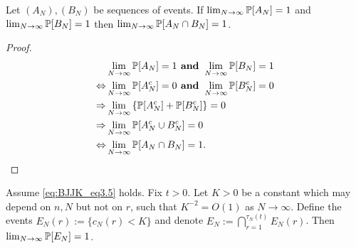 \begin{lemma}\label{thm:lim_AandB}
Let $(A_N) , (B_N)$ be sequences of events. 
If $\lim_{N\to\infty}\mathbb{P}[A_N] =1$ and $\lim_{N\to\infty}\mathbb{P}[B_N]=1$ then $\lim_{N\to\infty} \mathbb{P} [A_N \cap B_N] =1$.
\end{lemma}
\begin{proof}
\begin{align*}
&\lim_{N\to\infty} \mathbb{P}[A_N] =1 \textbf{ and } 
        \lim_{N\to\infty} \mathbb{P}[B_N] =1 \notag\\
\Leftrightarrow &\lim_{N\to\infty} \mathbb{P}[A_N^c] =0 \textbf{ and } 
        \lim_{N\to\infty} \mathbb{P}[B_N^c] =0 \notag\\
\Rightarrow &\lim_{N\to\infty} \left\{ \mathbb{P}[A_N^c] 
        + \mathbb{P}[B_N^c] \right\} =0 \notag\\
\Rightarrow &\lim_{N\to\infty} \mathbb{P}[A_N^c \cup B_N^c] =0 \notag\\
\Leftrightarrow &\lim_{N\to\infty} \mathbb{P}[ A_N \cap B_N ] =1. \qedhere
\end{align*}
\end{proof}

\begin{lemma}\label{thm:indicators_cN}
Assume \eqref{eq:BJJK_eq3.5} holds. Fix $t>0$.
Let $K>0$ be a constant which may depend on $n, N$ but not on $r$, such that $K^{-2} = O(1)$ as $N\to\infty$.
Define the events $E_N(r) := \{ c_N(r) < K \}$ and denote $E_N := \bigcap_{r=1}^{\tau_N(t)} E_N(r)$.
Then $\lim_{N\to\infty} \mathbb{P}[E_N]=1$.
\end{lemma}

